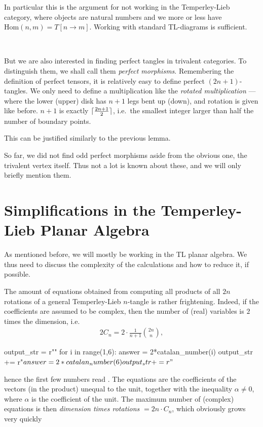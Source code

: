 In particular this is the argument for not working in the Temperley-Lieb category, where objects are natural numbers and we more or less have $\mathrm{Hom}(n,m) = T[n\rightarrow m].$ Working with standard TL-diagrams is sufficient.

~\\
\begin{remark}
But we are also interested in finding perfect tangles in trivalent categories. To distinguish them, we shall call them \emph{perfect morphisms}. Remembering the definition of perfect tensors, it is relatively easy to define perfect $(2n+1)$-tangles. We only need to define a multiplication like the \emph{rotated multiplication} --- where the lower (upper) disk has $n+1$ legs bent up (down), and rotation is given like before. $n+1$ is exactly $\lceil\frac{2n+1}{2}\rceil$, i.e.\ the smallest integer larger than half the number of boundary points.

This can be justified similarly to the previous lemma.

So far, we did not find odd perfect morphisms aside from the obvious one, the trivalent vertex itself. Thus not a lot is known about these, and we will only briefly mention them.
\end{remark}

\section{Simplifications in the Temperley-Lieb Planar Algebra}
As mentioned before, we will mostly be working in the TL planar algebra. We thus need to discuss  the complexity of the calculations and how to reduce it, if possible. 

The amount of equations obtained from computing all products of all $2n$ rotations of a general Temperley-Lieb $n$-tangle is rather frightening. Indeed, if the coefficients are assumed to be complex, then the number of (real) variables is $2$ times the dimension, i.e.\
\begin{align*}
2 C_n = 2 \cdot \frac{1}{n+1}\binom{2n}{n},
\end{align*}
\begin{sagesilent}
output_str = r""
for i in range(1,6):
    answer = 2*catalan_number(i)
    output_str += r"$%

answer = 2*catalan_number(6)
output_str += r"$%
\end{sagesilent}
hence the first few numbers read . The equations are the coefficients of the vectors (in the product) unequal to the unit, together with the inequality $\alpha \neq 0$, where $\alpha$ is the coefficient of the unit. The maximum number of (complex) equations is then \emph{dimension times rotations} $= 2 n\cdot C_n$, which obviously grows very quickly

